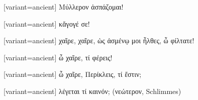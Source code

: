 %

\switchcolumn

\begin{greek}[variant=ancient]%
Μύλλερον ἀσπάζομαι!

\end{greek}%
\switchcolumn*

%

\switchcolumn

\begin{greek}[variant=ancient]%
κἄγογέ σε!

\end{greek}%
\switchcolumn*

%


\switchcolumn

\begin{greek}[variant=ancient]%
χαῖρε, χαῖρε, ὡς ἀσμένῳ μοι ἦλθες, ὦ φίλτατε!

\end{greek}%
\switchcolumn*

%

\switchcolumn

\begin{greek}[variant=ancient]%
ὦ χαῖρε, τί φέρεις!

\end{greek}%
\switchcolumn*

%

\switchcolumn

\begin{greek}[variant=ancient]%
ὦ χαῖρε, Περίκλεις, τί ἔστιν;

\end{greek}%
\switchcolumn*

%

\switchcolumn

\begin{greek}[variant=ancient]%
λέγεται τί καινόν; (νεώτερον, \textgerman[spelling=old,babelshorthands=true]{Schlimmes})

\end{greek}%
\switchcolumn*

